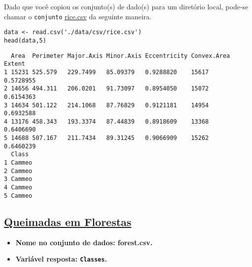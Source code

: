 \documentclass[11pt]{article}
\begin{document}
Dado que você copiou os conjunto(s) de dado(s) para um diretório
local, pode-se chamar o \texttt{conjunto} \href{https://drive.google.com/file/d/1zFkHbui6Ro2N\_tNsgPSeajyl7g8XrdAc/view?usp=sharing}{rice.csv} da seguinte maneira.

\begin{verbatim}
data <- read.csv('./data/csv/rice.csv')
head(data,5)
\end{verbatim}

\begin{verbatim}
  Area  Perimeter Major.Axis Minor.Axis Eccentricity Convex.Area Extent   
1 15231 525.579   229.7499   85.09379   0.9288820    15617       0.5728955
2 14656 494.311   206.0201   91.73097   0.8954050    15072       0.6154363
3 14634 501.122   214.1068   87.76829   0.9121181    14954       0.6932588
4 13176 458.343   193.3374   87.44839   0.8918609    13368       0.6406690
5 14688 507.167   211.7434   89.31245   0.9066909    15262       0.6460239
  Class 
1 Cammeo
2 Cammeo
3 Cammeo
4 Cammeo
5 Cammeo
\end{verbatim}
\clearpage

\subsection{\href{https://archive.ics.uci.edu/ml/datasets/Algerian+Forest+Fires+Dataset++}{Queimadas em Florestas}}
\label{sec:org34124f2}
\begin{itemize}
\item \textbf{Nome no conjunto de dados: \textbf{forest.csv}.}
\item \textbf{Variável resposta: \texttt{Classes}.}
\end{itemize}
\end{document}
